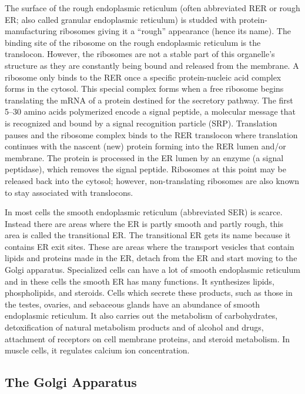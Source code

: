 The surface of the rough endoplasmic reticulum (often abbreviated RER or rough ER; also called granular endoplasmic reticulum) is studded with protein-manufacturing ribosomes giving it a ``rough'' appearance (hence its name). The binding site of the ribosome on the rough endoplasmic reticulum is the translocon. However, the ribosomes are not a stable part of this organelle's structure as they are constantly being bound and released from the membrane. A ribosome only binds to the RER once a specific protein-nucleic acid complex forms in the cytosol. This special complex forms when a free ribosome begins translating the mRNA of a protein destined for the secretory pathway. The first 5--30 amino acids polymerized encode a signal peptide, a molecular message that is recognized and bound by a signal recognition particle (SRP). Translation pauses and the ribosome complex binds to the RER translocon where translation continues with the nascent (new) protein forming into the RER lumen and/or membrane. The protein is processed in the ER lumen by an enzyme (a signal peptidase), which removes the signal peptide. Ribosomes at this point may be released back into the cytosol; however, non-translating ribosomes are also known to stay associated with translocons.

In most cells the smooth endoplasmic reticulum (abbreviated SER) is scarce. Instead there are areas where the ER is partly smooth and partly rough, this area is called the transitional ER. The transitional ER gets its name because it contains ER exit sites. These are areas where the transport vesicles that contain lipids and proteins made in the ER, detach from the ER and start moving to the Golgi apparatus. Specialized cells can have a lot of smooth endoplasmic reticulum and in these cells the smooth ER has many functions. It synthesizes lipids, phospholipids, and steroids. Cells which secrete these products, such as those in the testes, ovaries, and sebaceous glands have an abundance of smooth endoplasmic reticulum. It also carries out the metabolism of carbohydrates, detoxification of natural metabolism products and of alcohol and drugs, attachment of receptors on cell membrane proteins, and steroid metabolism. In muscle cells, it regulates calcium ion concentration.

\hypertarget{the-golgi-apparatus}{%
\subsection{The Golgi Apparatus}\label{the-golgi-apparatus}}

